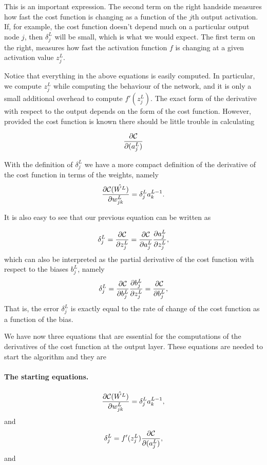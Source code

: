 This is an important expression. The second term on the right handside
measures how fast the cost function is changing as a function of the $j$th
output activation.  If, for example, the cost function doesn't depend
much on a particular output node $j$, then $\delta_j^L$ will be small,
which is what we would expect. The first term on the right, measures
how fast the activation function $f$ is changing at a given activation
value $z_j^L$.

Notice that everything in the above equations is easily computed.  In
particular, we compute $z_j^L$ while computing the behaviour of the
network, and it is only a small additional overhead to compute
$f'(z^L_j)$.  The exact form of the derivative with respect to the
output depends on the form of the cost function.
However, provided the cost function is known there should be little
trouble in calculating

\[
\frac{\partial {\cal C}}{\partial (a_j^L)}
\]

With the definition of $\delta_j^L$ we have a more compact definition of the derivative of the cost function in terms of the weights, namely
\[
\frac{\partial{\cal C}(\hat{W^L})}{\partial w_{jk}^L}  =  \delta_j^La_k^{L-1}.
\]

It is also easy to see that our previous equation can be written as

\[
\delta_j^L =\frac{\partial {\cal C}}{\partial z_j^L}= \frac{\partial {\cal C}}{\partial a_j^L}\frac{\partial a_j^L}{\partial z_j^L},
\]
which can also be interpreted as the partial derivative of the cost function with respect to the biases $b_j^L$, namely
\[
\delta_j^L = \frac{\partial {\cal C}}{\partial b_j^L}\frac{\partial b_j^L}{\partial z_j^L}=\frac{\partial {\cal C}}{\partial b_j^L},
\]
That is, the error $\delta_j^L$ is exactly equal to the rate of change of the cost function as a function of the bias. 

We have now three equations that are essential for the computations of the derivatives of the cost function at the output layer. These equations are needed to start the algorithm and they are


\paragraph{The starting equations.}

\begin{equation}
\frac{\partial{\cal C}(\hat{W^L})}{\partial w_{jk}^L}  =  \delta_j^La_k^{L-1},
\end{equation}
and
\begin{equation}
\delta_j^L = f'(z_j^L)\frac{\partial {\cal C}}{\partial (a_j^L)},
\end{equation}
and

